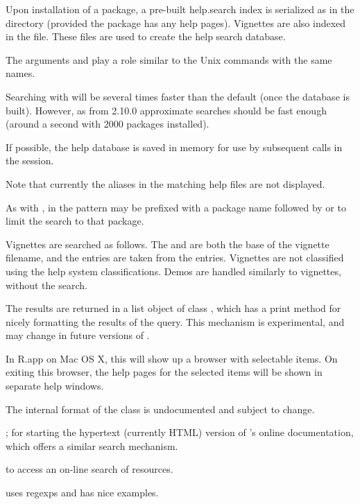 \begin{Details}\relax
Upon installation of a package, a pre-built help.search index is
serialized as  in the  directory
(provided the package has any help pages).  Vignettes are also 
indexed in the  file.  These files are used to
create the help search database.

The arguments  and  play a role similar to
the Unix commands with the same names.

Searching with  will be several times faster
than the default (once the database is built).  However, as from
\R{} 2.10.0 approximate searches should be fast enough (around a second
with 2000 packages installed).

If possible, the help database is saved in memory for use by
subsequent calls in the session.

Note that currently the aliases in the matching help files are not
displayed.

As with , in  the pattern may be prefixed with a 
package name followed by \code{::} or \code{:::} to limit the search
to that package.

Vignettes are searched as follows.  The  and 
 are both the base of the vignette filename, and the 
 entries are taken from the 
entries.  Vignettes are not classified using the help system 
 classifications.  Demos are handled
similarly to vignettes, without the   search.
\end{Details}
%
\begin{Value}
The results are returned in a list object of class ,
which has a print method for nicely formatting the results of the
query.  This mechanism is experimental, and may change in future
versions of \R{}.

In R.app on Mac OS X, this will show up a browser with selectable items. On
exiting this browser, the help pages for the selected items will be
shown in separate help windows.

The internal format of the class is undocumented and subject to change.
\end{Value}
%
\begin{SeeAlso}\relax
{};
 for starting the hypertext (currently HTML)
version of \R{}'s online documentation, which offers a similar search
mechanism.

 to access an on-line search of \R{} resources.

 uses regexps and has nice examples.
\end{SeeAlso}
